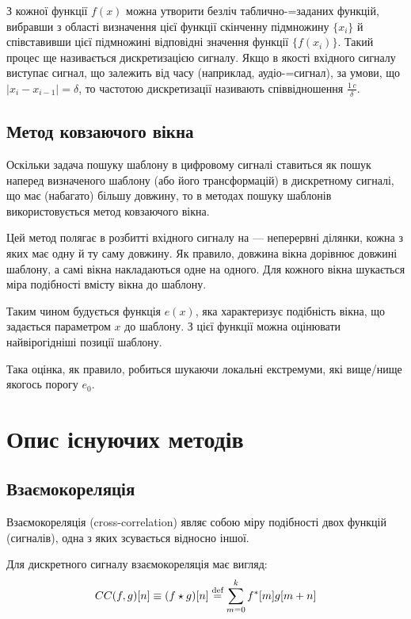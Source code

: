     З кожної функції $f(x)$ можна утворити безліч таблично-=заданих функцій, вибравши з області визначення цієї
    функції скінченну підмножину $\{x_i\}$ й співставивши цієї підмножині відповідні значення функції $\{f(x_i)\}$.
    Такий процес ще називається дискретизацією сигналу.
    Якщо в якості вхідного сигналу виступає сигнал, що залежить від часу (наприклад, аудіо-=сигнал), за умови, що $|
    x_i - x_{i-1}| = \delta$, то частотою дискретизації називають співвідношення $\frac{1\,c}{\delta}$.

    \subsection{Метод ковзаючого вікна}
        Оскільки задача пошуку шаблону в цифровому сигналі ставиться як пошук наперед визначеного шаблону (або його
        трансформацій) в дискретному сигналі, що має (набагато) більшу довжину, то в методах пошуку шаблонів
        використовується метод ковзаючого вікна.

        Цей метод полягає в розбитті вхідного сигналу на  --- неперервні ділянки, кожна з яких має
        одну й ту саму довжину.
        Як правило, довжина вікна дорівнює довжині шаблону, а самі вікна накладаються одне на одного.
        Для кожного вікна шукається міра подібності вмісту вікна до шаблону.

        Таким чином будується функція $e(x)$, яка характеризує подібність вікна, що задається параметром $x$ до
        шаблону.
        З цієї функції можна оцінювати найвірогідніші позиції шаблону.

        Така оцінка, як правило, робиться шукаючи локальні екстремуми, які вище/нище якогось порогу $e_{0}$.

\section{Опис існуючих методів}
    \subsection{Взаємокореляція}
        Взаємокореляція (cross-correlation) являє собою міру подібності двох функцій (сигналів), одна з яких
        зсувається відносно іншої.

        Для дискретного сигналу взаємокореляція має вигляд:
        \begin{equation}
            CC(f,g)[ n ] \equiv (f \star g)[ n ] \stackrel{\text{def}}{=} \sum\limits_{m=0}^{k} f^*[m] g[ m + n ]
        \end{equation}

